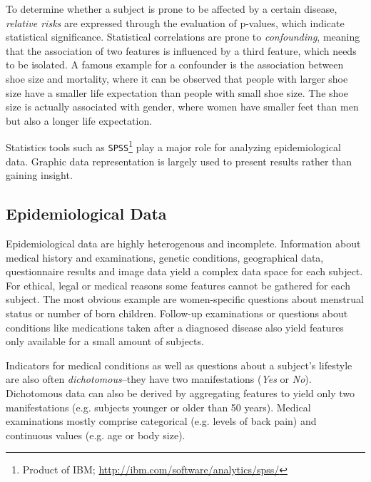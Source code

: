 \documentclass[journal]{style/vgtc} 			          %
\begin{document}
To determine whether a subject is prone to be affected by a certain disease, \emph{relative risks} are expressed through the evaluation of p-values, which indicate statistical significance.
%
Statistical correlations are prone to \emph{confounding}, meaning that the association of two features is influenced by a third feature, which needs to be isolated.
%
A famous example for a confounder is the association between shoe size and mortality, where it can be observed that people with larger shoe size have a smaller life expectation than people with small shoe size.
%
The shoe size is actually associated with gender, where women have smaller feet than men but also a longer life expectation.
%

Statistics tools such as \texttt{SPSS}\footnote{Product of IBM; \url{http://ibm.com/software/analytics/spss/}} play a major role for analyzing epidemiological data.
%
Graphic data representation is largely used to present results rather than gaining insight.
	
\subsection{Epidemiological Data} \label{EpidemiologicalData}
Epidemiological data are highly heterogenous and incomplete.
%
Information about medical history and examinations, genetic conditions, geographical data, questionnaire results and image data yield a complex data space for each subject.
%
%
For ethical, legal or medical reasons some features cannot be gathered for each subject.
%
The most obvious example are women-specific questions about menstrual status or number of born children.
%
Follow-up examinations or questions about conditions like medications taken after a diagnosed disease also yield features only available for a small amount of subjects.
%

Indicators for medical conditions as well as questions about a subject's lifestyle are also often \emph{dichotomous}--they have two manifestations (\emph{Yes} or \emph{No}).
%
%
Dichotomous data can also be derived by aggregating features to yield only two manifestations (e.g. subjects younger or older than 50 years).
%
Medical examinations mostly comprise categorical (e.g. levels of back pain) and continuous values (e.g. age or body size).
\end{document}
